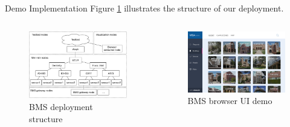 \documentclass[final,hyperref={pdfpagelabels=false},20pt]{beamer}
\begin{document}
\begin{frame}[t]
\begin{columns}[t]
\begin{column}{.465\textwidth}
\begin{block}{Demo Implementation}
Figure \ref{fig:node-structure} illustrates the structure of our deployment.

\begin{columns}[T]

\begin{column}{.47\textwidth}
\begin{figure}
\includegraphics[width=\linewidth]{bms-nodes-structure}
\caption{BMS deployment structure}
\label{fig:node-structure}
\end{figure}
\end{column}

\begin{column}{.51\textwidth}
\begin{figure}
\includegraphics[width=\linewidth]{bms-ui-demo.png}
\caption{BMS browser UI demo}
\label{fig:bms-ui}
\end{figure}
\end{column}


\end{columns}
\end{block}
\end{column}
\end{columns}
\end{frame}
\end{document}
